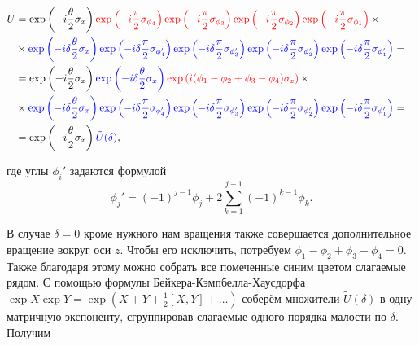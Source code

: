 \begin{equation}
\begin{aligned}
	U &= \exp\left( - i \frac{\theta}{2} \sigma_x \right)
	\begingroup\color{red}\exp\left( - i \frac{\pi}{2} \sigma_{\phi_4}\right)\exp\left( - i \frac{\pi}{2} \sigma_{\phi_3}\right)\exp\left( - i \frac{\pi}{2} \sigma_{\phi_2}\right)\exp\left( - i \frac{\pi}{2} \sigma_{\phi_1}\right)\endgroup \times &\\
	&\times \begingroup\color{blue}\exp\left( - i\delta \frac{\theta}{2} \sigma_x \right)\exp\left( - i \delta \frac{\pi}{2} \sigma_{\phi_4'}\right)\exp\left( - i \delta \frac{\pi}{2} \sigma_{\phi_3'}\right)\exp\left( - i \delta \frac{\pi}{2} \sigma_{\phi_2'}\right)\exp\left( - i \delta \frac{\pi}{2} \sigma_{\phi_1'}\right)\endgroup =& \\
	&= \exp\left( - i \frac{\theta}{2} \sigma_x \right)\begingroup\color{blue}\exp\left( - i \delta \frac{\theta}{2} \sigma_x \right)\endgroup\begingroup\color{red}\exp\left(i(\phi_1 - \phi_2 + \phi_3 - \phi_4)\sigma_z\right)\endgroup \times & \\
	&\times \begingroup\color{blue}\exp\left( - i\delta \frac{\theta}{2} \sigma_x \right)\exp\left( - i \delta \frac{\pi}{2} \sigma_{\phi_4'}\right)\exp\left( - i \delta \frac{\pi}{2} \sigma_{\phi_3'}\right)\exp\left( - i \delta \frac{\pi}{2} \sigma_{\phi_2'}\right)\exp\left( - i \delta \frac{\pi}{2} \sigma_{\phi_1'}\right)\endgroup =&\\
	&= \exp\left( - i \frac{\theta}{2} \sigma_x \right) \begingroup\color{blue}\tilde{U}(\delta)\endgroup,
\end{aligned}
\end{equation}

где углы $\phi_i'$ задаются формулой 
\begin{equation}
	\phi_j' = (-1)^{j-1}\phi_j + 2\sum_{k=1}^{j-1}(-1)^{k-1}\phi_k.
\end{equation}


В случае $\delta = 0$ кроме нужного нам вращения также совершается дополнительное вращение вокруг оси $z$. Чтобы его исключить, потребуем $\phi_1 - \phi_2 + \phi_3 - \phi_4 = 0$. Также благодаря этому можно собрать все помеченные синим цветом слагаемые рядом. С помощью формулы Бейкера-Кэмпбелла-Хаусдорфа $\exp{X} \exp{Y} = \exp{\left(X + Y + \frac{1}{2}\left[X, Y \right] + \ldots\right)}$ соберём множители $\tilde{U}(\delta)$ в одну матричную экспоненту, сгруппировав слагаемые одного порядка малости по $\delta$. Получим

